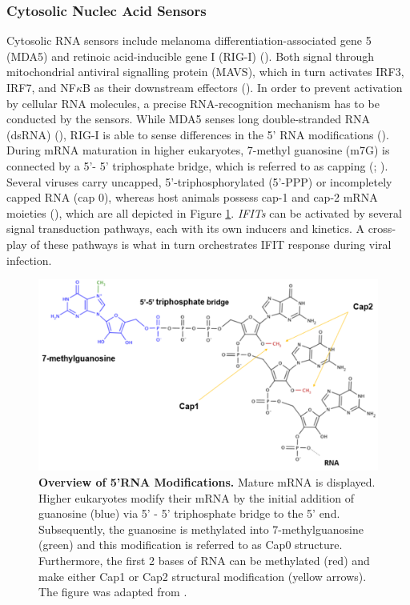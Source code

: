 \subsubsection{Cytosolic Nuclec Acid Sensors} \label{Cytosolic Nuclec Acid Sensors}
Cytosolic RNA sensors include melanoma differentiation-associated gene 5 (MDA5) and retinoic acid-inducible gene I (RIG-I) (\cite{Vladimer2014IFITs:Proteins}). Both signal through mitochondrial antiviral signalling protein (MAVS), which in turn activates IRF3, IRF7, and NF\(\kappa\)B as their downstream effectors (\cite{Ashley2019Interferon-IndependentCytomegalovirus}). In order to prevent activation by cellular RNA molecules, a precise RNA-recognition mechanism has to be conducted by the sensors. While MDA5 senses long double-stranded RNA (dsRNA) (\cite{Brisse2019ComparativeMDA5.}), RIG-I is able to sense differences in the 5’ RNA modifications (\cite{Schlee2016DiscriminatingSensing}). During mRNA maturation in higher eukaryotes, 7-methyl guanosine (m7G) is connected by a 5’- 5’ triphosphate bridge, which is referred to as capping (\cite{Devarkar2016StructuralRIG-I}; \cite{Ramanathan2016MRNAApplications}). Several viruses carry uncapped, 5’-triphosphorylated (5’-PPP) or incompletely capped RNA (cap 0), whereas host animals possess cap-1 and cap-2 mRNA moieties (\cite{Choi2018ACaps}), which are all depicted in Figure \ref{fig:Overview of 5'RNA Modifications.}. \textit{IFITs} can be activated by several signal transduction pathways, each with its own inducers and kinetics. A cross-play of these pathways is what in turn orchestrates IFIT response during viral infection.

\begin{figure}
    \centering
    \includegraphics[width=0.75\linewidth]{04. Introduction//Figs/5-RNA Modifications.png}
    \caption[Overview of 5'RNA Modifications.]{\textbf{Overview of 5'RNA Modifications.} Mature mRNA is displayed. Higher eukaryotes modify their mRNA by the initial addition of guanosine (blue) via 5’ - 5’ triphosphate bridge to the 5’ end. Subsequently, the guanosine is methylated into 7-methylguanosine (green) and this modification is referred to as Cap0 structure. Furthermore, the first 2 bases of RNA can be methylated (red) and make either Cap1 or Cap2 structural modification (yellow arrows). The figure was adapted from \cite{Picard-Jean2013RNAGenomes}.}
    \label{fig:Overview of 5'RNA Modifications.}
\end{figure}




